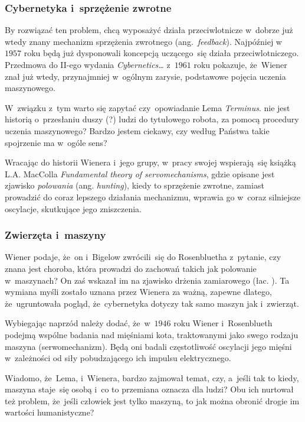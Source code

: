 \documentclass[10pt,t]{beamer}
\begin{document}
\begin{frame}
  \frametitle{Cybernetyka i~sprzężenie zwrotne}


  By rozwiązać ten problem, chcą wyposażyć działa przeciwlotnicze
  w~dobrze już wtedy znany
  mechanizm sprzężenia zwrotnego (ang.~\textit{feedback}). Najpóźniej
  w~$1957$ roku będą już dysponowali koncepcją uczącego~się działa
  przeciwlotniczego. Przedmowa do II-ego wydania \textit{Cybernetics\ldots}
  z~$1961$ roku pokazuje, że~Wiener znał już wtedy, przynajmniej w~ogólnym
  zarysie, podstawowe pojęcia uczenia maszynowego.

  W~związku z~tym warto się zapytać czy~opowiadanie Lema \textit{Terminus}.
  nie jest historią o~przesłaniu duszy (?) ludzi do tytułowego robota, za
  pomocą procedury uczenia maszynowego? Bardzo jestem ciekawy, czy według
  Państwa takie spojrzenie ma w~ogóle sens?

  Wracając do historii Wienera i~jego grupy, w~pracy swojej wspierają~się
  książką L.A. MacColla
  {\textit{Fundamental theory of servomechanisms}}, gdzie opisane jest
  zjawisko \textit{polowania} (ang. \textit{hunting}), kiedy to
  sprzężenie zwrotne, zamiast prowadzić do coraz lepszego działania
  mechanizmu, wprawia go w~coraz silniejsze oscylacje, skutkujące jego
  zniszczenia.

\end{frame}





\begin{frame}
  \frametitle{Zwierzęta i~maszyny}


  Wiener podaje, że~on i~Bigelow zwrócili~się do Rosenbluetha z~pytanie, czy
  znana jest choroba, która prowadzi do zachowań takich jak polowanie
  w~maszynach? On zaś wskazał im na zjawisko drżenia zamiarowego
  (łac.
  ). Ta wymiana myśli zostało uznana przez Wienera za
  ważną, zapewne dlatego, że~ugruntowała pogląd, że~cybernetyka dotyczy
  tak samo maszyn jak i~zwierząt.

  Wybiegając naprzód należy dodać, że~w~$1946$ roku Wiener i~Rosenblueth
  podejmą wspólne badania nad mięśniami kota, traktowanymi jako swego
  rodzaju maszyna (serwomechanizm). Będą oni badali częstotliwość oscylacji
  jego mięśni w~zależności od siły pobudzającego ich impulsu elektrycznego.

  Wiadomo, że~Lema, i~Wienera, bardzo zajmował temat, czy, a~jeśli tak to
  kiedy, maszyna staje~się osobą i~co to przemiana oznacza dla ludzi?
  Obu ich nurtował też problem, że~jeśli człowiek jest tylko maszyną, to jak
  można obronić drogie im wartości humanistyczne?

\end{frame}
\end{document}
